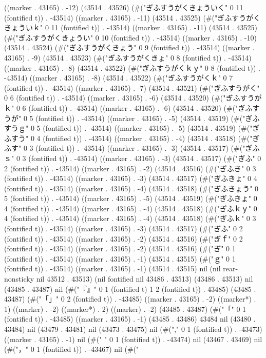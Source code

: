 ((marker . 43165) . -12) (43514 . 43526) (#("ぎふすうがくきょういく" 0 11 (fontified t)) . -43514) ((marker . 43165) . -11) (43514 . 43525) (#("ぎふすうがくきょういｋ" 0 11 (fontified t)) . -43514) ((marker . 43165) . -11) (43514 . 43525) (#("ぎふすうがくきょうい" 0 10 (fontified t)) . -43514) ((marker . 43165) . -10) (43514 . 43524) (#("ぎふすうがくきょう" 0 9 (fontified t)) . -43514) ((marker . 43165) . -9) (43514 . 43523) (#("ぎふすうがくきょ" 0 8 (fontified t)) . -43514) ((marker . 43165) . -8) (43514 . 43522) (#("ぎふすうがくｋｙ" 0 8 (fontified t)) . -43514) ((marker . 43165) . -8) (43514 . 43522) (#("ぎふすうがくｋ" 0 7 (fontified t)) . -43514) ((marker . 43165) . -7) (43514 . 43521) (#("ぎふすうがく" 0 6 (fontified t)) . -43514) ((marker . 43165) . -6) (43514 . 43520) (#("ぎふすうがｋ" 0 6 (fontified t)) . -43514) ((marker . 43165) . -6) (43514 . 43520) (#("ぎふすうが" 0 5 (fontified t)) . -43514) ((marker . 43165) . -5) (43514 . 43519) (#("ぎふすうｇ" 0 5 (fontified t)) . -43514) ((marker . 43165) . -5) (43514 . 43519) (#("ぎふすう" 0 4 (fontified t)) . -43514) ((marker . 43165) . -4) (43514 . 43518) (#("ぎふす" 0 3 (fontified t)) . -43514) ((marker . 43165) . -3) (43514 . 43517) (#("ぎふｓ" 0 3 (fontified t)) . -43514) ((marker . 43165) . -3) (43514 . 43517) (#("ぎふ" 0 2 (fontified t)) . -43514) ((marker . 43165) . -2) (43514 . 43516) (#("ぎふき" 0 3 (fontified t)) . -43514) ((marker . 43165) . -3) (43514 . 43517) (#("ぎふきょ" 0 4 (fontified t)) . -43514) ((marker . 43165) . -4) (43514 . 43518) (#("ぎふきょう" 0 5 (fontified t)) . -43514) ((marker . 43165) . -5) (43514 . 43519) (#("ぎふきょ" 0 4 (fontified t)) . -43514) ((marker . 43165) . -4) (43514 . 43518) (#("ぎふｋｙ" 0 4 (fontified t)) . -43514) ((marker . 43165) . -4) (43514 . 43518) (#("ぎふｋ" 0 3 (fontified t)) . -43514) ((marker . 43165) . -3) (43514 . 43517) (#("ぎふ" 0 2 (fontified t)) . -43514) ((marker . 43165) . -2) (43514 . 43516) (#("ぎｆ" 0 2 (fontified t)) . -43514) ((marker . 43165) . -2) (43514 . 43516) (#("ぎ" 0 1 (fontified t)) . -43514) ((marker . 43165) . -1) (43514 . 43515) (#("ｇ" 0 1 (fontified t)) . -43514) ((marker . 43165) . -1) (43514 . 43515) nil (nil rear-nonsticky nil 43512 . 43513) (nil fontified nil 43486 . 43513) (43486 . 43513) nil (43485 . 43487) nil (#("『』" 0 1 (fontified t) 1 2 (fontified t)) . 43485) (43485 . 43487) (#("「」" 0 2 (fontified t)) . -43485) ((marker . 43165) . -2) ((marker*) . 1) ((marker) . -2) ((marker*) . 2) ((marker) . -2) (43485 . 43487) (#("「" 0 1 (fontified t)) . -43485) ((marker . 43165) . -1) (43485 . 43486) 43484 nil (43480 . 43484) nil (43479 . 43481) nil (43473 . 43475) nil (#("," 0 1 (fontified t)) . -43473) ((marker . 43165) . -1) nil (#(" " 0 1 (fontified t)) . -43474) nil (43467 . 43469) nil (#("，" 0 1 (fontified t)) . -43467) nil (#("
